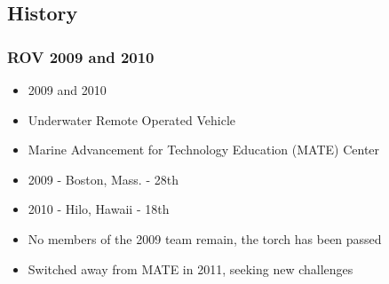 \documentclass{beamer}
\begin{document}
%
%
%
%
%    
%
%
%
\subsection{History}
\frame
{
    \frametitle{ROV 2009 and 2010}
    \begin{itemize}
        \item 2009 and 2010
        \item Underwater Remote Operated Vehicle
        \item Marine Advancement for Technology Education (MATE) Center
        \item 2009 - Boston, Mass. - 28th
        \item 2010 - Hilo, Hawaii - 18th
        \item No members of the 2009 team remain, the torch has been passed
        \item Switched away from MATE in 2011, seeking new challenges
    \end{itemize}
}
\end{document}
